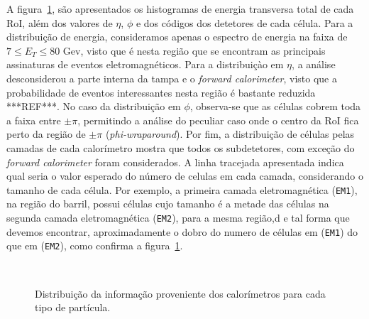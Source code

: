 A figura~\ref{fig:estatistica_inicial}, são apresentados os histogramas de energia transversa total de cada RoI, além dos valores de $\eta$, $\phi$ e dos códigos dos detetores de cada célula. Para a distribuição de energia, consideramos apenas o espectro de energia na faixa de $7 \le E_T \le 80$ Gev, visto que é nesta região que se encontram as principais assinaturas de eventos eletromagnéticos. Para a distribuiçào em $\eta$, a análise desconsiderou a parte interna da tampa e o \emph{forward calorimeter}, visto que a probabilidade de eventos interessantes nesta região é bastante reduzida ***REF***.  No caso da distribuição em $\phi$, observa-se que  as células cobrem toda a faixa entre $\pm \pi$, permitindo a análise do peculiar caso onde o centro da RoI fica perto da região de $\pm \pi$ (\emph{phi-wraparound}). Por fim, a distribuição de células pelas camadas de cada calorímetro mostra que todos os subdetetores, com exceção do \emph{forward calorimeter} foram considerados. A linha tracejada apresentada indica qual seria o valor esperado do número de celulas em cada camada, considerando o tamanho de cada célula. Por exemplo, a primeira camada eletromagnética (\texttt{EM1}), na região do barril,  possui células cujo tamanho é a metade das células na segunda camada eletromagnética (\texttt{EM2}), para a mesma região,d e tal forma que devemos encontrar, aproximadamente o dobro do numero de células em (\texttt{EM1}) do que em (\texttt{EM2}), como confirma a figura~\ref{fig:estatistica_inicial}.

\begin{figure}
\centering 
{} \\
\caption{Distribuição da informação proveniente dos calorímetros para cada tipo de partícula.} 
\label{fig:estatistica_inicial} 
\end{figure} 


